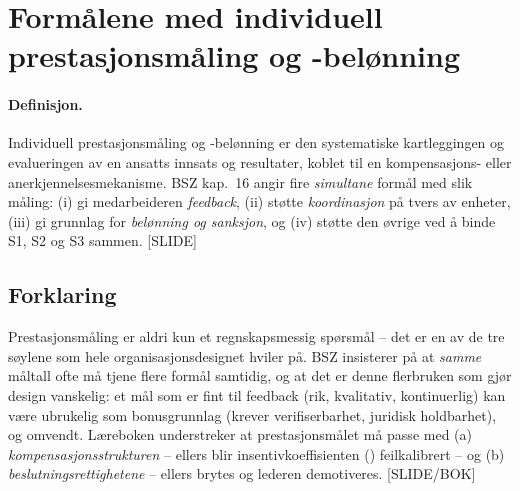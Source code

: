 \section{Formålene med individuell prestasjonsmåling og -belønning}\label{thr:performance-measurement-purposes}

\paragraph{Definisjon.} Individuell prestasjonsmåling og -belønning er den systematiske kartleggingen og evalueringen av en ansatts innsats og resultater, koblet til en kompensasjons- eller anerkjennelsesmekanisme. BSZ kap.\ 16 angir fire \emph{simultane} formål med slik måling: (i) gi medarbeideren \emph{feedback}, (ii) støtte \emph{koordinasjon} på tvers av enheter, (iii) gi grunnlag for \emph{belønning og sanksjon}, og (iv) støtte den øvrige  ved å binde S1, S2 og S3 sammen. [SLIDE]

\subsection*{Forklaring}

Prestasjonsmåling er aldri kun et regnskapsmessig spørsmål -- det er en av de tre søylene som hele organisasjonsdesignet hviler på. BSZ insisterer på at \emph{samme} måltall ofte må tjene flere formål samtidig, og at det er denne flerbruken som gjør design vanskelig: et mål som er fint til feedback (rik, kvalitativ, kontinuerlig) kan være ubrukelig som bonusgrunnlag (krever verifiserbarhet, juridisk holdbarhet), og omvendt. Læreboken understreker at prestasjonsmålet må passe med (a) \emph{kompensasjonsstrukturen} -- ellers blir insentivkoeffisienten () feilkalibrert -- og (b) \emph{beslutningsrettighetene} -- ellers brytes  og lederen demotiveres. [SLIDE/BOK]

